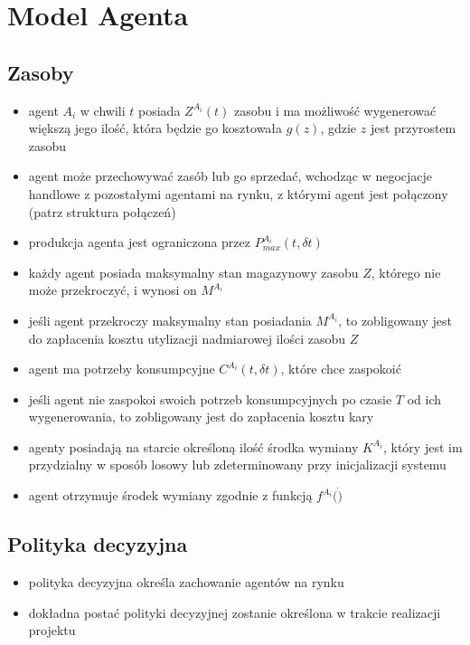 \documentclass[]{article}
\providecommand{\tightlist}{%
  \setlength{\itemsep}{0pt}\setlength{\parskip}{0pt}}
\begin{document}
\hypertarget{model-agenta}{%
\section{Model Agenta}\label{model-agenta}}

\hypertarget{zasoby}{%
\subsection{Zasoby}\label{zasoby}}

\begin{itemize}
\tightlist
\item
  agent \(A_i\) w chwili \(t\) posiada \(Z^{A_i}(t)\) zasobu i ma
  możliwość wygenerować większą jego ilość, która będzie go kosztowała
  \(g(z)\), gdzie \(z\) jest przyrostem zasobu
\item
  agent może przechowywać zasób lub go sprzedać, wchodząc w negocjacje
  handlowe z pozostałymi agentami na rynku, z którymi agent jest
  połączony (patrz struktura połączeń)
\item
  produkcja agenta jest ograniczona przez \(P^{A_i}_{max}(t, \delta t)\)
\item
  każdy agent posiada maksymalny stan magazynowy zasobu \(Z\), którego
  nie może przekroczyć, i wynosi on \(M^{A_i}\)
\item
  jeśli agent przekroczy maksymalny stan posiadania \(M^{A_i}\), to
  zobligowany jest do zapłacenia kosztu utylizacji nadmiarowej ilości
  zasobu \(Z\)
\item
  agent ma potrzeby konsumpcyjne \(C^{A_i}(t, \delta t)\), które chce
  zaspokoić
\item
  jeśli agent nie zaspokoi swoich potrzeb konsumpcyjnych po czasie \(T\)
  od ich wygenerowania, to zobligowany jest do zapłacenia kosztu kary
\item
  agenty posiadają na starcie określoną ilość środka wymiany
  \(K^{A_i}\), który jest im przydzialny w sposób losowy lub
  zdeterminowany przy inicjalizacji systemu
\item
  agent otrzymuje środek wymiany zgodnie z funkcją \(f^{A_i}(\dot)\)
\end{itemize}

\hypertarget{polityka-decyzyjna}{%
\subsection{Polityka decyzyjna}\label{polityka-decyzyjna}}

\begin{itemize}
\tightlist
\item
  polityka decyzyjna określa zachowanie agentów na rynku
\item
  dokładna postać polityki decyzyjnej zostanie określona w trakcie
  realizacji projektu
\end{itemize}
\end{document}
